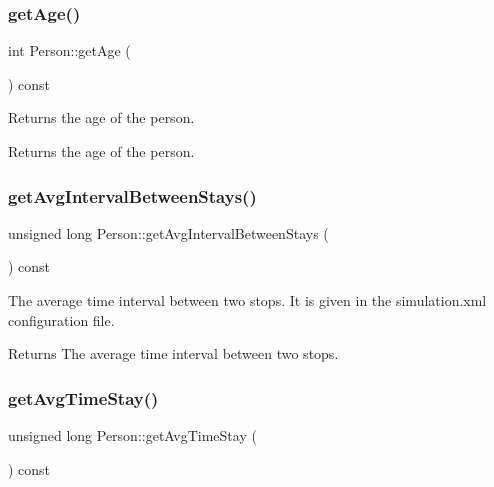 \mbox{\label{class_person_a4b66dbee570398920b8fb6aacddd2559}} 
\subsubsection{\texorpdfstring{getAge()}{getAge()}}
{\footnotesize\ttfamily int Person\+::get\+Age (\begin{DoxyParamCaption}{ }\end{DoxyParamCaption}) const}

Returns the age of the person. \begin{DoxyReturn}{Returns}
the age of the person. 
\end{DoxyReturn}
\mbox{\label{class_person_a59d3ea8e10928537043ee7b3d24a470c}} 
\subsubsection{\texorpdfstring{getAvgIntervalBetweenStays()}{getAvgIntervalBetweenStays()}}
{\footnotesize\ttfamily unsigned long Person\+::get\+Avg\+Interval\+Between\+Stays (\begin{DoxyParamCaption}{ }\end{DoxyParamCaption}) const}

The average time interval between two stops. It is given in the simulation.\+xml configuration file. \begin{DoxyReturn}{Returns}
The average time interval between two stops. 
\end{DoxyReturn}
\mbox{\label{class_person_a2b01d9997db6f6d4555dbc5ac9898077}} 
\subsubsection{\texorpdfstring{getAvgTimeStay()}{getAvgTimeStay()}}
{\footnotesize\ttfamily unsigned long Person\+::get\+Avg\+Time\+Stay (\begin{DoxyParamCaption}{ }\end{DoxyParamCaption}) const}

